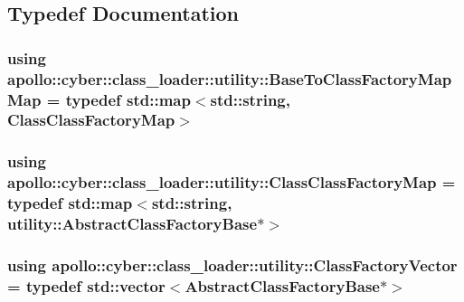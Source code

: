 \subsection{Typedef Documentation}
\hypertarget{namespaceapollo_1_1cyber_1_1class__loader_1_1utility_af56a53fd55c852ce98e9135bdff04cbc}{
\subsubsection[{Base\-To\-Class\-Factory\-Map\-Map}]{\setlength{\rightskip}{0pt plus 5cm}using {\bf apollo\-::cyber\-::class\-\_\-loader\-::utility\-::\-Base\-To\-Class\-Factory\-Map\-Map} = typedef std\-::map$<$std\-::string, {\bf Class\-Class\-Factory\-Map}$>$}}\label{namespaceapollo_1_1cyber_1_1class__loader_1_1utility_af56a53fd55c852ce98e9135bdff04cbc}
\hypertarget{namespaceapollo_1_1cyber_1_1class__loader_1_1utility_a4cf2c311509ec13f7d3c5d1516bcc590}{
\subsubsection[{Class\-Class\-Factory\-Map}]{\setlength{\rightskip}{0pt plus 5cm}using {\bf apollo\-::cyber\-::class\-\_\-loader\-::utility\-::\-Class\-Class\-Factory\-Map} = typedef std\-::map$<$std\-::string, {\bf utility\-::\-Abstract\-Class\-Factory\-Base}$\ast$$>$}}\label{namespaceapollo_1_1cyber_1_1class__loader_1_1utility_a4cf2c311509ec13f7d3c5d1516bcc590}
\hypertarget{namespaceapollo_1_1cyber_1_1class__loader_1_1utility_acb2be87bf5f4284e4ea493f4238073dc}{
\subsubsection[{Class\-Factory\-Vector}]{\setlength{\rightskip}{0pt plus 5cm}using {\bf apollo\-::cyber\-::class\-\_\-loader\-::utility\-::\-Class\-Factory\-Vector} = typedef std\-::vector$<${\bf Abstract\-Class\-Factory\-Base}$\ast$$>$}}\label{namespaceapollo_1_1cyber_1_1class__loader_1_1utility_acb2be87bf5f4284e4ea493f4238073dc}
